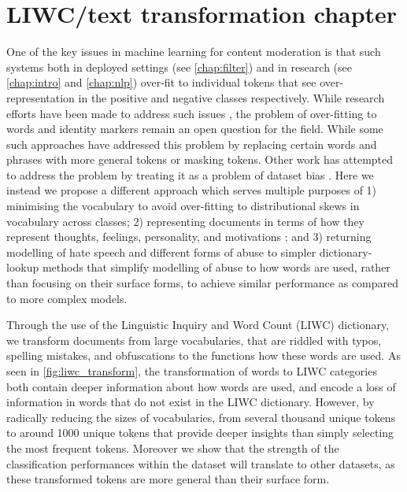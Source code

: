 \ifpdf
    \graphicspath{{Chapter5/Figs/Raster/}{Chapter5/Figs/PDF/}{Chapter5/Figs/}}
\else
    \graphicspath{{Chapter5/Figs/Vector/}{Chapter5/Figs/}}
\fi

\chapter{LIWC/text transformation chapter}\label{chap:liwc}

One of the key issues in machine learning for content moderation is that such systems both in deployed settings (see \autoref{chap:filter}) and in research (see \autoref{chap:intro} and \autoref{chap:nlp}) over-fit to individual tokens that see over-representation in the positive and negative classes respectively. While research efforts have been made to address such issues \cite{CITE: cite papers that try to address overfitting}, the problem of over-fitting to words and identity markers remain an open question for the field. While some such approaches have addressed this problem by replacing certain words and phrases with more general tokens \cite{CITE: Replacing token papers} or masking \cite{CITE: Masking token paper} tokens. Other work has attempted to address the problem by treating it as a problem of dataset bias \cite{CITE: Bias papers}. Here we instead we propose a different approach which serves multiple purposes of 1) minimising the vocabulary to avoid over-fitting to distributional skews in vocabulary across classes; 2) representing documents in terms of how they represent thoughts, feelings, personality, and motivations \cite{LIWC:2015}; and 3) returning modelling of hate speech and different forms of abuse to simpler dictionary-lookup methods that simplify modelling of abuse to how words are used, rather than focusing on their surface forms, to achieve similar performance as compared to more complex models.

Through the use of the Linguistic Inquiry and Word Count (LIWC) dictionary, we transform documents from large vocabularies, that are riddled with typos, spelling mistakes, and obfuscations to the functions how these words are used. As seen in \autoref{fig:liwc_transform}, the transformation of words to LIWC categories both contain deeper information about how words are used, and encode a loss of information in words that do not exist in the LIWC dictionary. However, by radically reducing the sizes of vocabularies, from several thousand unique tokens to around 1000 unique tokens that provide deeper insights than simply selecting the most frequent tokens. Moreover we show that the strength of the classification performances within the dataset will translate to other datasets, as these transformed tokens are more general than their surface form.

